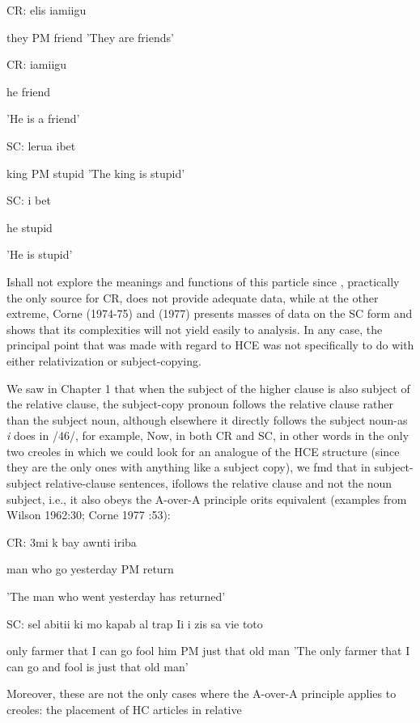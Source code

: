 \ea\label{ex:44}
 CR: elis iamiigu
\glt
\z

they PM friend 'They are friends'

\ea\label{ex:45}
 CR: iamiigu
\glt
\z

he friend

'He is a friend'


\ea\label{ex:46}
 SC: lerua ibet
\glt
\z

king PM stupid 'The king is stupid'

\ea\label{ex:47}
 SC: i bet
\glt
\z

he stupid

'He is stupid'

Ishall not explore the meanings and functions of this particle since \citet{Wilson1962}, practically the only source for CR, does not provide adequate data, while at the other extreme, Corne (1974-75) and (1977) presents masses of data on the SC form and shows that its complexities will not yield easily to analysis. In any case, the principal point that was made with regard to HCE was not specifically to do with either relativization or subject-copying.

We saw in Chapter 1 that when the subject of the higher clause is also subject of the relative clause, the subject-copy pronoun follows the relative clause rather than the subject noun, although elsewhere it directly follows the subject noun-as \textit{i} does in /46/, for example, Now, in both CR and SC, in other words in the only two creoles in which we could look for an analogue of the HCE structure (since they are the only ones with anything like a subject copy), we fmd that in subject-subject relative-clause sentences, ifollows the relative clause and not the noun subject, i.e., it also obeys the A-over-A principle orits equivalent (examples from Wilson 1962:30; Corne 1977 :53):

\ea\label{ex:48}
 CR: 3mi k bay awnti iriba
\glt
\z

man who go yesterday PM return

'The man who went yesterday has returned'

\ea\label{ex:49}
 SC: sel abitii ki mo kapab al trap Ii i zis sa vie toto
\glt
\z

only farmer that I can go fool him PM just that old man 'The only farmer that I can go and fool is just that old man'

Moreover, these are not the only cases where the A-over-A principle applies to creoles: the placement of HC articles in relative\-

